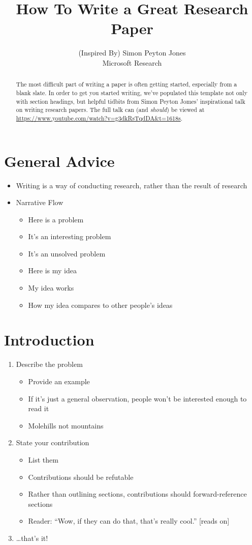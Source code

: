 \documentclass[11pt,a4paper]{article}
\title{How To Write a Great Research Paper}
\author{(Inspired By) Simon Peyton Jones \\
  Microsoft Research \\
  }
\date{}
\begin{document}
\maketitle
\begin{abstract}
 The most difficult part of writing a paper is often getting started, especially from a blank slate. In order to get you started writing, we've populated this template not only with section headings, but helpful tidbits from Simon Peyton Jomes' inspirational talk on writing research papers. The full talk can (and \textit{should}) be viewed at \url{https://www.youtube.com/watch?v=g3dkRsTqdDA&t=1618s}.
\end{abstract}

\section{General Advice}
\begin{itemize}
\item Writing is a way of conducting research, rather than the result of research
\item Narrative Flow
    \begin{itemize}
    \item Here is a problem
    \item  It's an interesting problem
    \item It's an unsolved problem
    \item Here is my idea
    \item My idea works
    \item How my idea compares to other people's ideas
    \end{itemize}
\end{itemize}

\section{Introduction}

\begin{enumerate}
\item Describe the problem
    \begin{itemize}
    \item Provide an example
    \item If it's just a general observation, people won't be interested enough to read it
    \item Molehills not mountains
    \end{itemize}
\item State your contribution
    \begin{itemize}
    \item List them
    \item Contributions should be refutable
    \item Rather than outlining sections, contributions should forward-reference sections
    \item Reader: ``Wow, if they can do that, that's really cool.'' [reads on]
    \end{itemize}
\item \dots that's it!
\end{enumerate}
\end{document}
